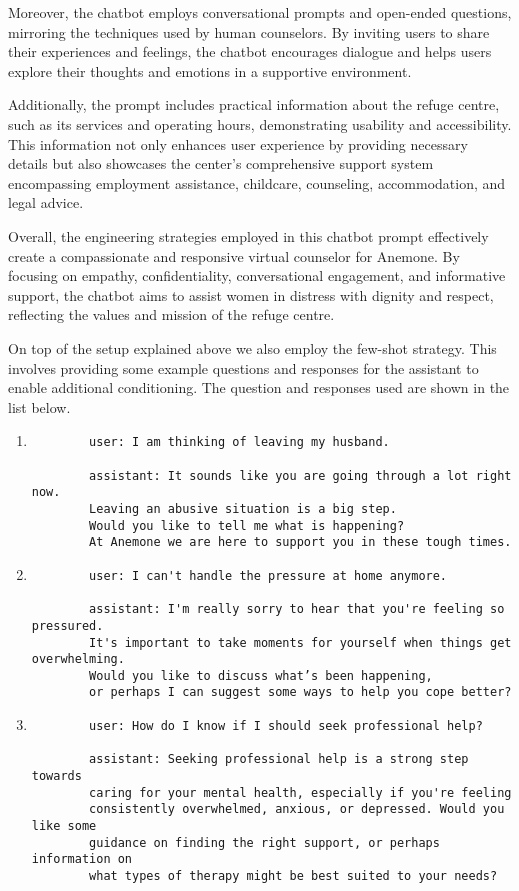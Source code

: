 Moreover, the chatbot employs conversational prompts and open-ended questions, mirroring the techniques used by human counselors. By inviting users to share their experiences and feelings, the chatbot encourages dialogue and helps users explore their thoughts and emotions in a supportive environment.

Additionally, the prompt includes practical information about the refuge centre, such as its services and operating hours, demonstrating usability and accessibility. This information not only enhances user experience by providing necessary details but also showcases the center's comprehensive support system encompassing employment assistance, childcare, counseling, accommodation, and legal advice.

Overall, the engineering strategies employed in this chatbot prompt effectively create a compassionate and responsive virtual counselor for Anemone. By focusing on empathy, confidentiality, conversational engagement, and informative support, the chatbot aims to assist women in distress with dignity and respect, reflecting the values and mission of the refuge centre.

On top of the setup explained above we also employ the few-shot strategy. This involves providing some example questions and responses for the assistant to enable additional conditioning. 
The question and responses used are shown in the list below. 


\begin{enumerate}
	\item 
	\begin{verbatim}
        user: I am thinking of leaving my husband.

        assistant: It sounds like you are going through a lot right now. 
        Leaving an abusive situation is a big step. 
        Would you like to tell me what is happening? 
        At Anemone we are here to support you in these tough times.
	\end{verbatim}
	\item
	\begin{verbatim}
        user: I can't handle the pressure at home anymore.

        assistant: I'm really sorry to hear that you're feeling so pressured. 
        It's important to take moments for yourself when things get overwhelming. 
        Would you like to discuss what’s been happening,
        or perhaps I can suggest some ways to help you cope better?
	\end{verbatim}
    \item
	\begin{verbatim}
        user: How do I know if I should seek professional help?
        
        assistant: Seeking professional help is a strong step towards
        caring for your mental health, especially if you're feeling
        consistently overwhelmed, anxious, or depressed. Would you like some
        guidance on finding the right support, or perhaps information on
        what types of therapy might be best suited to your needs?
	\end{verbatim}

\end{enumerate}


